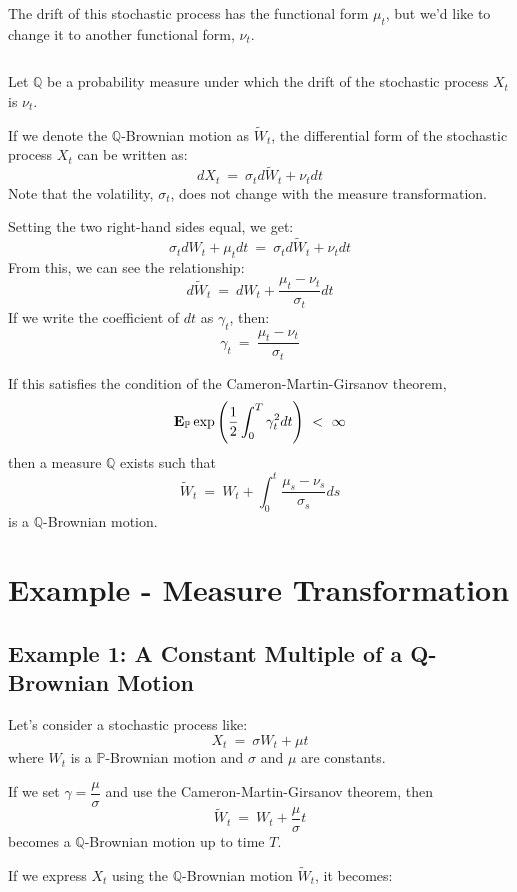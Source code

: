 \documentclass[uplatex,a4j,12pt,dvipdfmx]{jsarticle}
\begin{document}
The drift of this stochastic process has the functional form $\mu_{t}$, but we'd like to change it to another functional form, $\nu_{t}$.

${}$

Let $\mathbb{Q}$ be a probability measure under which the drift of the stochastic process $X_{t}$ is $\nu_{t}$.

If we denote the $\mathbb{Q}$-Brownian motion as $\tilde{W}_{t}$, the differential form of the stochastic process $X_{t}$ can be written as:
$$
	dX_{t}
	\ = \
	\sigma_{t} d \tilde{W}_{t}
	+
	\nu_{t} dt
$$
Note that the volatility, $\sigma_{t}$, does not change with the measure transformation.

Setting the two right-hand sides equal, we get:
$$
	\sigma_{t} dW_{t}
	+
	\mu_{t} dt
	\ = \
	\sigma_{t} d \tilde{W}_{t}
	+
	\nu_{t} dt
$$
From this, we can see the relationship:
$$
	d \tilde{W}_{t}
	\ = \
	d W_{t}
	+
	\dfrac{ \mu_{t} - \nu_{t} }{\sigma_{t}}
	dt
$$
If we write the coefficient of $dt$ as $\gamma_{t}$, then:
$$
	\gamma_{t}
	\ = \
	\dfrac{ \mu_{t} - \nu_{t} }{\sigma_{t}}
$$

If this satisfies the condition of the Cameron-Martin-Girsanov theorem,
$$
	{\bf E}_{\mathbb{P}} \exp \left( \dfrac{1}{2} \int^{T}_{0} \gamma_{t}^{2} dt \right)
	\ < \
	\infty
$$
then a measure $\mathbb{Q}$ exists such that
$$
	\tilde{W}_{t}
	\ = \
	W_{t}
	+
	\int^{t}_{0}
	\dfrac{ \mu_{s} - \nu_{s} }{\sigma_{s}}
	ds
$$
is a $\mathbb{Q}$-Brownian motion.
\section{Example - Measure Transformation}

\subsection{Example 1: A Constant Multiple of a Q-Brownian Motion}

Let's consider a stochastic process like:
$$
	X_{t}
	\ = \
	\sigma W_{t}
	+
	\mu t
$$
where $W_{t}$ is a $\mathbb{P}$-Brownian motion and $\sigma$ and $\mu$ are constants.

If we set $\gamma = \dfrac{\mu}{\sigma}$ and use the Cameron-Martin-Girsanov theorem, then
$$
	\tilde{W}_{t}
	\ = \
	W_{t}
	+
	\dfrac{\mu}{\sigma} t
$$
becomes a $\mathbb{Q}$-Brownian motion up to time $T$.

If we express $X_{t}$ using the $\mathbb{Q}$-Brownian motion $\tilde{W}_{t}$, it becomes:
\end{document}
